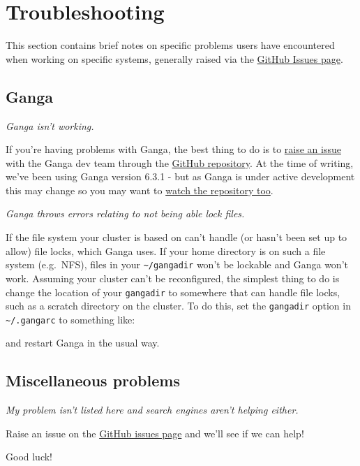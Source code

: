 \section{Troubleshooting}
\label{sec:troubleshooting}
This section contains brief notes on specific problems users have
encountered when working on specific systems, generally raised via the
\href{http://github.com/gridpp/user-guides/issues}{GitHub Issues page}.

\subsection{Ganga}\label{ganga}

\emph{Ganga isn't working.}

If you're having problems with Ganga, the best thing to do is to
\href{https://github.com/ganga-devs/ganga/issues}{raise an issue} with
the Ganga dev team through the
\href{https://github.com/ganga-devs/ganga/}{GitHub repository}. At the
time of writing, we've been using Ganga version 6.3.1 - but as Ganga is
under active development this may change so you may want to
\href{https://github.com/ganga-devs/ganga}{watch the repository too}.

\emph{Ganga throws errors relating to not being able lock files.}

If the file system your cluster is based on can't handle (or hasn't been
set up to allow) file locks, which Ganga uses. If your home directory is
on such a file system (e.g.~NFS), files in your
\texttt{\textasciitilde{}/gangadir} won't be lockable and Ganga won't
work. Assuming your cluster can't be reconfigured, the simplest thing to
do is change the location of your \texttt{gangadir} to somewhere that
can handle file locks, such as a scratch directory on the cluster. To do
this, set the \texttt{gangadir} option in
\texttt{\textasciitilde{}/.gangarc} to something like:

\begin{Shaded}
\begin{Highlighting}[]
 
\end{Highlighting}
\end{Shaded}

and restart Ganga in the usual way.

\subsection{Miscellaneous problems}

\emph{My problem isn't listed here and search engines aren't helping
either.}

Raise an issue on the
\href{http://github.com/gridpp/user-guides/issues}{GitHub issues page}
and we'll see if we can help!

Good luck!
